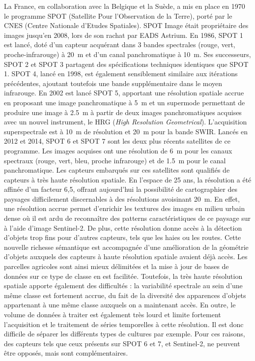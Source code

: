 La France, en collaboration avec la Belgique et la Suède, a mis en place en 1970 le programme SPOT (Satellite Pour l'Observation de la Terre), porté par le CNES (Centre Nationale d'Etudes Spatiales). SPOT Image était propriétaire des images jusqu'en 2008, lors de son rachat par EADS Astrium. En 1986, SPOT 1 est lancé, doté d'un capteur acquérant dans 3 bandes spectrales (rouge, vert, proche-infrarouge) à \SI{20}{\meter} et d'un canal panchromatique à \SI{10}{\meter}. Ses successeurs, SPOT 2 et SPOT 3 partagent des spécifications techniques identiques que SPOT 1. SPOT 4, lancé en 1998, est également sensiblement similaire aux itérations précédentes, ajoutant toutefois une bande supplémentaire dans le moyen infrarouge. En 2002 est lancé SPOT 5, apportant une résolution spatiale accrue en proposant une image panchromatique à \SI{5}{m} et un \og supermode \fg{} permettant de produire une image à \SI{2,5}{\meter} à partir de deux images panchromatiques acquises avec un nouvel instrument, le HRG (\textit{High Resolution Geometrical}). L'acquisition superspectrale est à \SI{10}{\meter} de résolution et \SI{20}{\meter} pour la bande SWIR. Lancés en 2012 et 2014, SPOT 6 et SPOT 7 sont les deux plus récents satellites de ce programme. Les images acquises ont une résolution de \SI{6}{\meter} pour les canaux spectraux (rouge, vert, bleu, proche infrarouge) et de \SI{1,5}{\meter} pour le canal panchromatique. Les capteurs embarqués sur ces satellites sont qualifiés de capteurs à très haute résolution spatiale. En l'espace de 25 ans, la résolution a été affinée d'un facteur 6,5, offrant aujourd'hui la possibilité de cartographier des paysages difficilement discernables à des résolutions avoisinant \SI{20}{\meter}. En effet, une résolution accrue permet d'enrichir les textures des images en milieu urbain dense où il est ardu de reconnaître des patterns caractéristiques de ce paysage sur à l'aide d'image Sentinel-2. De plus, cette résolution donne accès à la détection d'objets trop fins pour d'autres capteurs, tels que les haies ou les routes. Cette nouvelle richesse sémantique est accompagnée d'une amélioration de la géométrie d'objets auxquels des capteurs à haute résolution spatiale avaient déjà accès. Les parcelles agricoles sont ainsi mieux délimitées et la mise à jour de bases de données sur ce type de classe en est facilitée. Toutefois, la très haute résolution spatiale apporte également des difficultés : la variabilité spectrale au sein d'une même classe est fortement accrue, du fait de la diversité des apparences d'objets appartenant à une même classe auxquels on a maintenant accès. En outre, le volume de données à traiter est également très lourd et limite fortement l'acquisition et le traitement de séries temporelles à cette résolution. Il est donc difficile de séparer les différents types de cultures par exemple. Pour ces raisons, des capteurs tels que ceux présents sur SPOT 6 et 7, et Sentinel-2, ne peuvent être opposés, mais sont complémentaires.



